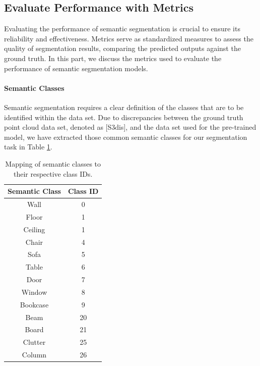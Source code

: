 \documentclass[11pt, a4paper,oneside,chapterprefix=false]{scrbook}
\newcommand{\FIXME}[1]{{\color{RED}{\textbf{FIX}: #1}}}
\begin{document}
\subsection{Evaluate Performance with Metrics}

Evaluating the performance of semantic segmentation is crucial to ensure its reliability and effectiveness. Metrics serve as standardized measures to assess the quality of segmentation results, comparing the predicted outputs against the ground truth. In this part, we discuss the metrics used to evaluate the performance of semantic segmentation models.

\paragraph{Semantic Classes}

Semantic segmentation requires a clear definition of the classes that are to be identified within the data set. Due to discrepancies between the ground truth point cloud data set, denoted as [S3dis], and the data set used for the pre-trained model, we have extracted those common semantic classes for our segmentation task in Table \ref{tab:semantic_classes}.

\begin{table}[H]
    \centering
    \begin{tabular}{|c|c|}
        \hline
        \textbf{Semantic Class} & \textbf{Class ID} \\
        \hline
        Wall & 0 \\
        Floor & 1 \\
        Ceiling & 1 \\
        Chair & 4 \\
        Sofa & 5 \\
        Table & 6 \\
        Door & 7 \\
        Window & 8 \\
        Bookcase & 9 \\
        Beam & 20 \\
        Board & 21 \\
        Clutter & 25 \\
        Column & 26 \\
        \hline
    \end{tabular}
    \caption{Mapping of semantic classes to their respective class IDs.} \FIXME{Change class}
    \label{tab:semantic_classes}
\end{table}
\end{document}
